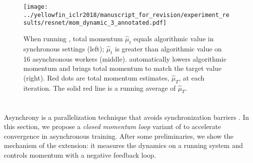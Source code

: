 \begin{figure*}
\centering
\texttt{[image: ../yellowfin\_iclr2018/manuscript\_for\_revision/experiment\_results/resnet/mom\_dynamic\_3\_annotated.pdf]}
	\vspace{-0.5em}
	\caption{
	When running \tuner, total momentum $\hat{\mu}_t$ equals algorithmic value in synchronous settings (left); $\hat{\mu}_t$ is greater than algorithmic value on 16 asynchronous workers (middle).
	\Asynctuner automatically lowers algorithmic momentum and brings total momentum to match the target value (right).
	Red dots are total momentum estimates, $\hat{\mu}_T$, at each iteration. 
The solid red line is a running average of $\hat{\mu}_T$.
	}
	\label{fig:we-can-measure}
\end{figure*}

\section{\Asynctuner}
\label{sec:async_tuner}

Asynchrony is a parallelization technique that avoids synchronization barriers \citep{recht2011hogwild}. 
In this section, we propose a {\em closed momentum loop} variant of \tuner to accelerate convergence in asynchronous training. 
After some preliminaries, we show the mechanism of the extension: 
it measures the dynamics on a running system and controls momentum with a negative feedback loop.
